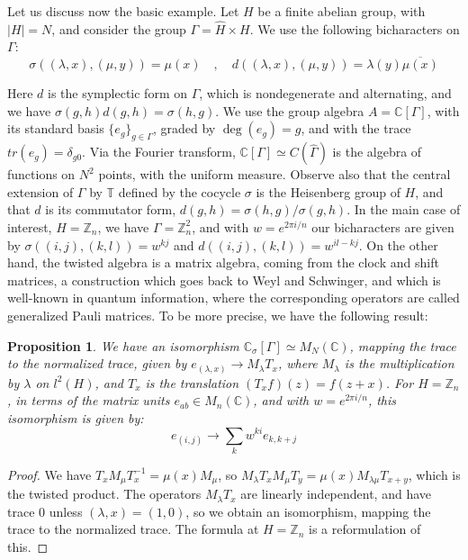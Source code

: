 \documentclass[11pt]{amsart}
\newtheorem{proposition}[theorem]{Proposition}
\theoremstyle{definition}
\begin{document}
Let us discuss now the basic example. Let $H$ be a finite abelian group, with $|H|=N$, and consider the group $\Gamma=\widehat{H}\times H$. We use the following bicharacters on $\Gamma$:
$$\sigma((\lambda,x),(\mu,y))=\mu(x)\quad,\quad d((\lambda,x),(\mu,y))=\lambda(y)\overline{\mu(x)}$$

Here $d$ is the symplectic form on $\Gamma$, which is nondegenerate and alternating, and we have $\sigma(g,h)d(g,h)=\sigma(h,g)$. We use the group algebra $A=\mathbb C[\Gamma]$, with its standard basis $\{e_g\}_{g\in\Gamma}$, graded by $\deg(e_g)=g$, and with the trace $tr(e_g)=\delta_{g0}$. Via the Fourier transform, $\mathbb C[\Gamma]\simeq C(\widehat{\Gamma})$ is the algebra of functions on $N^2$ points, with the uniform measure. Observe also that the central extension of $\Gamma$ by $\mathbb T$ defined by the cocycle $\sigma$ is the Heisenberg group of $H$, and that $d$ is its commutator form, $d(g,h)=\sigma(h,g)/\sigma(g,h)$. In the main case of interest, $H=\mathbb Z_n$, we have $\Gamma=\mathbb Z_n^2$, and with $w=e^{2\pi i/n}$ our bicharacters are given by $\sigma((i,j),(k,l))=w^{kj}$ and $d((i,j),(k,l))=w^{il-kj}$. On the other hand, the twisted algebra is a matrix algebra, coming from the clock and shift matrices, a construction which goes back to Weyl and Schwinger, and which is well-known in quantum information, where the corresponding operators are called generalized Pauli matrices. To be more precise, we have the following result:

\begin{proposition}
We have an isomorphism $\mathbb C_\sigma[\Gamma]\simeq M_N(\mathbb C)$, mapping the trace to the normalized trace, given by $e_{(\lambda,x)}\to M_\lambda T_x$, where $M_\lambda$ is the multiplication by $\lambda$ on $l^2(H)$, and $T_x$ is the translation $(T_xf)(z)=f(z+x)$. For $H=\mathbb Z_n$, in terms of the matrix units $e_{ab}\in M_n(\mathbb C)$, and with $w=e^{2\pi i/n}$, this isomorphism is given by:
$$e_{(i,j)}\to\sum_kw^{ki}e_{k,k+j}$$
\end{proposition}

\begin{proof}
We have $T_xM_\mu T_x^{-1}=\mu(x)M_\mu$, so $M_\lambda T_xM_\mu T_y=\mu(x)M_{\lambda\mu}T_{x+y}$, which is the twisted product. The operators $M_\lambda T_x$ are linearly independent, and have trace $0$ unless $(\lambda,x)=(1,0)$, so we obtain an isomorphism, mapping the trace to the normalized trace. The formula at $H=\mathbb Z_n$ is a reformulation of this.
\end{proof}
\end{document}

